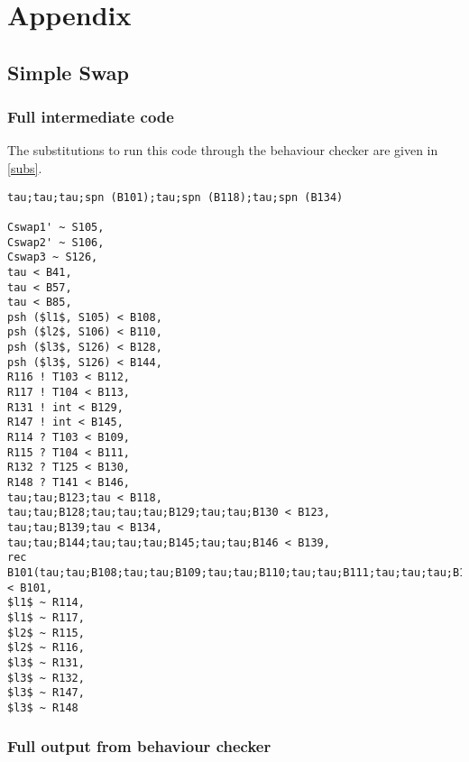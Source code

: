 \chapter*{Appendix}

\section*{Simple Swap}

\subsection*{Full intermediate code}

The substitutions to run this code through the behaviour checker are given in \ref{subs}. 

\begin{lstlisting} 
tau;tau;tau;spn (B101);tau;spn (B118);tau;spn (B134)

Cswap1' ~ S105,
Cswap2' ~ S106,
Cswap3 ~ S126,
tau < B41,
tau < B57,
tau < B85,
psh ($l1$, S105) < B108,
psh ($l2$, S106) < B110,
psh ($l3$, S126) < B128,
psh ($l3$, S126) < B144,
R116 ! T103 < B112,
R117 ! T104 < B113,
R131 ! int < B129,
R147 ! int < B145,
R114 ? T103 < B109,
R115 ? T104 < B111,
R132 ? T125 < B130,
R148 ? T141 < B146,
tau;tau;B123;tau < B118,
tau;tau;B128;tau;tau;tau;B129;tau;tau;B130 < B123,
tau;tau;B139;tau < B134,
tau;tau;B144;tau;tau;tau;B145;tau;tau;B146 < B139,
rec B101(tau;tau;B108;tau;tau;B109;tau;tau;B110;tau;tau;B111;tau;tau;tau;B112;tau;tau;tau;B113;tau;tau;B101) < B101,
$l1$ ~ R114,
$l1$ ~ R117,
$l2$ ~ R115,
$l2$ ~ R116,
$l3$ ~ R131,
$l3$ ~ R132,
$l3$ ~ R147,
$l3$ ~ R148
\end{lstlisting}

\subsection*{Full output from behaviour checker}


